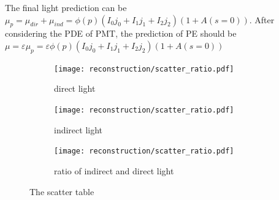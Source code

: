The final light prediction can be $\mu_p=\mu_{dir}+\mu_{ind}=\phi(p)(I_0j_0+I_1j_1+I_2j_2)(1+A(s=0))$. After considering the PDE of PMT, the prediction of PE should be $\mu=\varepsilon\mu_p=\varepsilon\phi(p)(I_0j_0+I_1j_1+I_2j_2)(1+A(s=0))$
\begin{figure}[htbp]
	\centering
	\begin{subfigure}{0.5\textwidth}
		\centering
		\texttt{[image: reconstruction/scatter\_ratio.pdf]}
		\caption{direct light}
		\label{fig:dir}
	\end{subfigure}%
	\hfill
	\begin{subfigure}{0.5\textwidth}
		\centering
		\texttt{[image: reconstruction/scatter\_ratio.pdf]}
		\caption{indirect light}
		\label{fig:ind}
	\end{subfigure}%
	\hfill
	\begin{subfigure}{0.5\textwidth}
		\centering
		\texttt{[image: reconstruction/scatter\_ratio.pdf]}
		\caption{ratio of indirect and direct light}
		\label{fig:ratio}
	\end{subfigure}
	\caption{The scatter table}
	\label{fig:scatterTable}
\end{figure}

